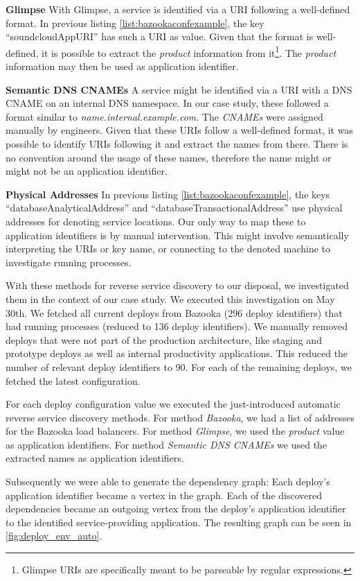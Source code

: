 \textbf{Glimpse} With Glimpse, a service is identified via a URI following a well-defined format. In previous listing \ref{list:bazookaconfexample}, the key ``soundcloudAppURI'' has such a URI as value. Given that the format is well-defined, it is possible to extract the \emph{product} information from it\footnote{Glimpse URIs are specifically meant to be parseable by regular expressions.}. The \emph{product} information may then be used as application identifier.

\textbf{Semantic DNS CNAMEs} A service might be identified via a URI with a DNS CNAME on an internal DNS namespace. In our case study, these followed a format similar to
\emph{{name}.internal.example.com}. The \emph{CNAMEs} were assigned manually by engineers. Given that these URIs follow a well-defined format, it was possible to identify URIs following it and extract the names from there. There is no convention around the usage of these names, therefore the name might or might not be an application identifier.

\textbf{Physical Addresses} In previous listing \ref{list:bazookaconfexample}, the keys ``databaseAnalyticalAddress'' and ``databaseTransactionalAddress'' use physical addresses for denoting service locations. Our only way to map these to application identifiers is by manual intervention. This might involve semantically interpreting the URIs or key name, or connecting to the denoted machine to investigate running processes.

With these methods for reverse service discovery to our disposal, we investigated them in the context of our case study. We executed this investigation on May 30th. We fetched all current deploys from Bazooka (296 deploy identifiers) that had running processes (reduced to 136 deploy identifiers). We manually removed deploys that were not part of the production architecture, like staging and prototype deploys as well as internal productivity applications. This reduced the number of relevant deploy identifiers to 90. For each of the remaining deploys, we fetched the latest configuration.

For each deploy configuration value we executed the just-introduced automatic reverse service discovery methods. For method \emph{Bazooka}, we had a list of addresses for the Bazooka load balancers. For method \emph{Glimpse}, we used the \emph{product} value as application identifiers. For method \emph{Semantic DNS CNAMEs} we used the extracted names as application identifiers.

Subsequently we were able to generate the dependency graph: Each deploy's application identifier became a vertex in the graph. Each of the discovered dependencies became an outgoing vertex from the deploy's application identifier to the identified service-providing application. The resulting graph can be seen in \autoref{fig:deploy_env_auto}.

